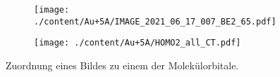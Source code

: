             \begin{figure}
                \centering
                \begin{subfigure}{0.48\textwidth}
                    \centering
                    \texttt{[image: ./content/Au+5A/IMAGE\_2021\_06\_17\_007\_BE2\_65.pdf]}
                \end{subfigure}
                \begin{subfigure}{0.48\textwidth}
                    \centering
                    \texttt{[image: ./content/Au+5A/HOMO2\_all\_CT.pdf]}
                \end{subfigure}
                \caption{Zuordnung eines Bildes zu einem der Molekülorbitale.}
            \end{figure}